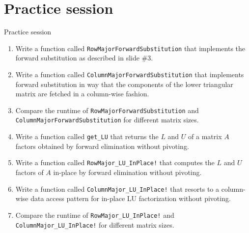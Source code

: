 \documentclass[t,usepdftitle=false]{beamer}
\begin{document}
\section{Practice session}

\begin{frame}[fragile]{Practice session}
\begin{enumerate}
\item Write a function called \texttt{RowMajorForwardSubstitution} that implements the forward substitution as described in slide \#3.
\item Write a function called \texttt{ColumnMajorForwardSubstitution} that implements forward substitution in way that the components of the lower triangular matrix are fetched in a column-wise fashion.
\item Compare the runtime of \texttt{RowMajorForwardSubstitution} and \texttt{ColumnMajorForwardSubstitution} for different matrix sizes.
\item Write a function called \texttt{get_LU} that returns the $L$ and $U$ of a matrix $A$ factors obtained by forward elimination without pivoting.
\item Write a function called \texttt{RowMajor_LU_InPlace!} that computes the $L$ and $U$ factors of $A$ in-place by forward elimination without pivoting.
\item Write a function called \texttt{ColumnMajor_LU_InPlace!} that resorts to a column-wise data access pattern for in-place LU factorization without pivoting.
\item Compare the runtime of \texttt{RowMajor_LU_InPlace!} and \texttt{ColumnMajor_LU_InPlace!} for different matrix sizes.
\end{enumerate}
\end{frame}
\end{document}
